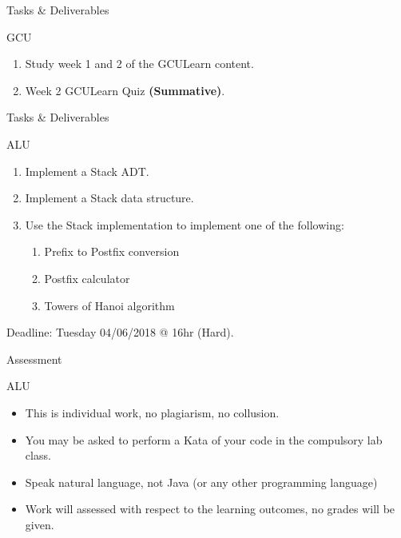 \documentclass[pdf]{beamer}
\begin{document}
\begin{frame}{Tasks \& Deliverables}
    \begin{block}{GCU}
        \begin{enumerate}
            \item Study week 1 and 2 of the GCULearn content.
            \item Week 2 GCULearn Quiz \textbf{(Summative)}.
        \end{enumerate}
    \end{block}
\end{frame}

\begin{frame}{Tasks \& Deliverables}
    \begin{block}{ALU}
        \begin{enumerate}
            \item Implement a Stack ADT.
            \item Implement a Stack data structure.
            \item Use the Stack implementation to implement one of the following:
            \begin{enumerate}
                \item Prefix to Postfix conversion
                \item Postfix calculator
                \item Towers of Hanoi algorithm
            \end{enumerate}
        \end{enumerate}
        Deadline: Tuesday 04/06/2018 @ 16hr (Hard).
    \end{block}
\end{frame}

\begin{frame}{Assessment}
    \begin{block}{ALU}
        \begin{itemize}
            \item This is individual work, no plagiarism, no collusion.
            \item You may be asked to perform a Kata of your code in the compulsory lab class.
            \item Speak natural language, not Java (or any other programming language)
            \item Work will assessed with respect to the learning outcomes, no grades will be given.
        \end{itemize}
    \end{block}
\end{frame}
\end{document}
